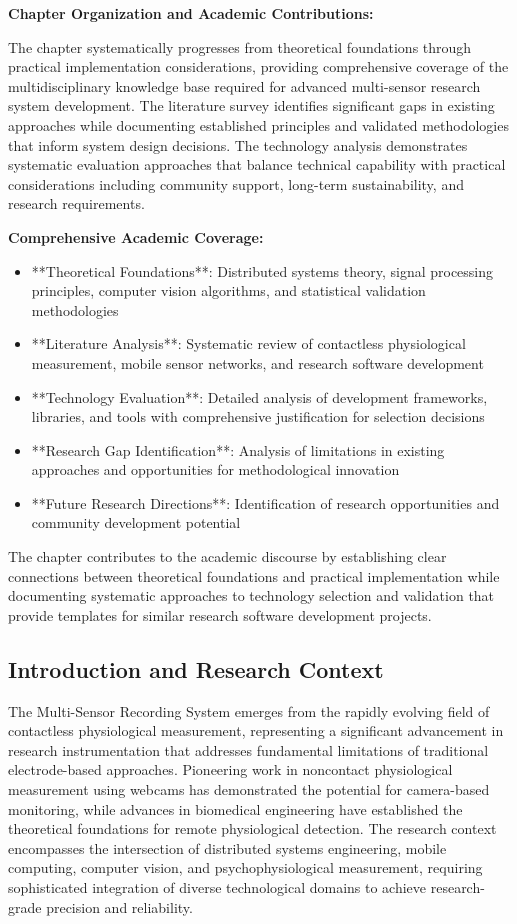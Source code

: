 \documentclass[11pt,a4paper]{report}
\begin{document}
\textbf{Chapter Organization and Academic Contributions:}

The chapter systematically progresses from theoretical foundations through practical implementation considerations,
providing comprehensive coverage of the multidisciplinary knowledge base required for advanced multi-sensor research
system development. The literature survey identifies significant gaps in existing approaches while documenting
established principles and validated methodologies that inform system design decisions. The technology analysis
demonstrates systematic evaluation approaches that balance technical capability with practical considerations including
community support, long-term sustainability, and research requirements.

\textbf{Comprehensive Academic Coverage:}

\begin{itemize}
\item **Theoretical Foundations**: Distributed systems theory, signal processing principles, computer vision algorithms, and
  statistical validation methodologies
\item **Literature Analysis**: Systematic review of contactless physiological measurement, mobile sensor networks, and
  research software development
\item **Technology Evaluation**: Detailed analysis of development frameworks, libraries, and tools with comprehensive
  justification for selection decisions
\item **Research Gap Identification**: Analysis of limitations in existing approaches and opportunities for methodological
  innovation
\item **Future Research Directions**: Identification of research opportunities and community development potential

\end{itemize}
The chapter contributes to the academic discourse by establishing clear connections between theoretical foundations and
practical implementation while documenting systematic approaches to technology selection and validation that provide
templates for similar research software development projects.

\subsection{Introduction and Research Context}

The Multi-Sensor Recording System emerges from the rapidly evolving field of contactless physiological measurement,
representing a significant advancement in research instrumentation that addresses fundamental limitations of traditional
electrode-based approaches. Pioneering work in noncontact physiological measurement using webcams has demonstrated the
potential for camera-based monitoring, while advances in biomedical engineering have established the theoretical
foundations for remote physiological detection. The research context encompasses the intersection of distributed systems
engineering, mobile computing, computer vision, and psychophysiological measurement, requiring sophisticated integration
of diverse technological domains to achieve research-grade precision and reliability.
\end{document}
